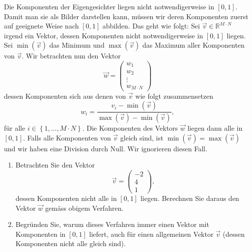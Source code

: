 Die Komponenten der Eigengesichter liegen nicht notwendigerweise in $\left[0,1\right]$.
Damit man sie als Bilder darstellen kann, müssen wir deren Komponenten zuerst auf geeignete Weise nach $\left[0,1\right]$ abbilden.
Das geht wie folgt:
Sei $\vec v\in\mathbb R^{M\cdot N}$ irgend ein Vektor, dessen Komponenten nicht notwendigerweise in $\left[0,1\right]$ liegen.
Sei $\min\left(\vec v\right)$ das Minimum und $\max\left(\vec v\right)$ das Maximum aller Komponenten von $\vec v$.
Wir betrachten nun den Vektor
\begin{equation*}
	\vec w=
	\begin{pmatrix}
		w_1 \\
		w_2 \\
		\vdots \\
		w_{M\cdot N}
	\end{pmatrix}
\end{equation*}
dessen Komponenten sich aus denen von $\vec v$ wie folgt zusammensetzen
\begin{equation*}
	w_i=\frac{v_i-\min\left(\vec v\right)}{\max\left(\vec v\right)-\min\left(\vec v\right)},
\end{equation*}
für alle $i\in\left\{1,\ldots,M\cdot N\right\}$.
Die Komponenten des Vektors $\vec w$ liegen dann alle in $\left[0,1\right]$.
Falls alle Komponenten von $\vec v$ gleich sind, ist $\min\left(\vec v\right)=\max\left(\vec v\right)$ und wir haben eine Division durch Null.
Wir ignorieren diesen Fall.
\begin{aufgabe} \label{aufg:scaling}
	\phantom{text}
	\begin{enumerate}[label=(\alph*)]
		\item Betrachten Sie den Vektor
		\begin{equation*}
			\vec v=
			\begin{pmatrix}
				-2 \\
				4 \\
				1
			\end{pmatrix},
		\end{equation*}
		dessen Komponenten nicht alle in $\left[0,1\right]$ liegen.
		Berechnen Sie daraus den Vektor $\vec w$ gemäss obigem Verfahren.
		\item Begründen Sie, warum dieses Verfahren immer einen Vektor mit Komponenten in $\left[0,1\right]$ liefert, auch für einen allgemeinen Vektor $\vec v$ (dessen Komponenten nicht alle gleich sind).
	\end{enumerate}
\end{aufgabe}
